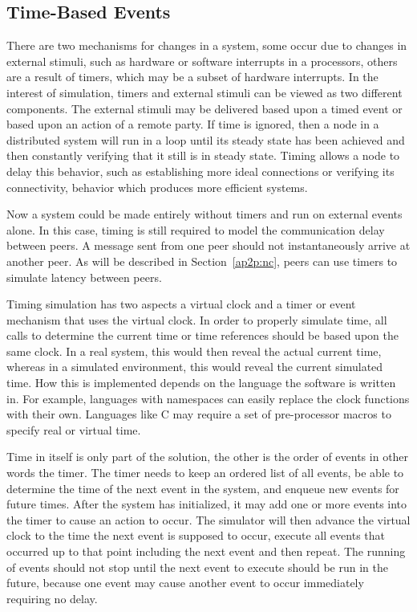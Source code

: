 \subsection{Time-Based Events}

There are two mechanisms for changes in a system, some occur due to changes in
external stimuli, such as hardware or software interrupts in a processors,
others are a result of timers, which may be a subset of hardware interrupts.
In the interest of simulation, timers and external stimuli can be viewed as two
different components.  The external stimuli may be delivered based upon a timed
event or based upon an action of a remote party.  If time is ignored, then a
node in a distributed system will run in a loop until its steady state has been
achieved and then constantly verifying that it still is in steady state.
Timing allows a node to delay this behavior, such as establishing more ideal
connections or verifying its connectivity, behavior which produces more
efficient systems.

Now a system could be made entirely without timers and run on external events
alone.  In this case, timing is still required to model the communication delay
between peers.  A message sent from one peer should not instantaneously arrive
at another peer.  As will be described in Section~\ref{ap2p:nc}, peers can use
timers to simulate latency between peers.

Timing simulation has two aspects a virtual clock and a timer or event
mechanism that uses the virtual clock.  In order to properly simulate time, all
calls to determine the current time or time references should be based upon the
same clock.  In a real system, this would then reveal the actual current time,
whereas in a simulated environment, this would reveal the current simulated
time.  How this is implemented depends on the language the software is written
in.  For example, languages with namespaces can easily replace the clock
functions with their own.  Languages like C may require a set of pre-processor
macros to specify real or virtual time.

Time in itself is only part of the solution, the other is the order of events
in other words the timer.  The timer needs to keep an ordered list of all
events, be able to determine the time of the next event in the system, and
enqueue new events for future times.  After the system has initialized, it may
add one or more events into the timer to cause an action to occur.  The
simulator will then advance the virtual clock to the time the next event is
supposed to occur, execute all events that occurred up to that point including
the next event and then repeat.  The running of events should not stop until
the next event to execute should be run in the future, because one event may
cause another event to occur immediately requiring no delay.

